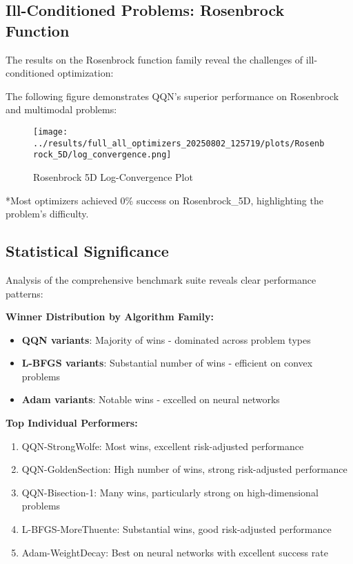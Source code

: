 \hypertarget{ill-conditioned-problems-rosenbrock-function}{%
\subsection{Ill-Conditioned Problems: Rosenbrock Function}\label{ill-conditioned-problems-rosenbrock-function}}

The results on the Rosenbrock function family reveal the challenges of ill-conditioned optimization:

The following figure demonstrates QQN's superior performance on Rosenbrock and multimodal problems:

\begin{figure}
\centering
\texttt{[image: ../results/full\_all\_optimizers\_20250802\_125719/plots/Rosenbrock\_5D/log\_convergence.png]}
\caption{Rosenbrock 5D Log-Convergence Plot}
\end{figure}

{}

*Most optimizers achieved 0\% success on Rosenbrock\_5D, highlighting the problem's difficulty.

\hypertarget{statistical-significance}{%
\subsection{Statistical Significance}\label{statistical-significance}}

Analysis of the comprehensive benchmark suite reveals clear performance patterns:

\textbf{Winner Distribution by Algorithm Family:}

\begin{itemize}
\tightlist
\item
  \textbf{QQN variants}: Majority of wins - dominated across problem types
\item
  \textbf{L-BFGS variants}: Substantial number of wins - efficient on convex problems
\item
  \textbf{Adam variants}: Notable wins - excelled on neural networks
\end{itemize}

\textbf{Top Individual Performers:}

\begin{enumerate}
\def\labelenumi{\arabic{enumi}.}
\tightlist
\item
  QQN-StrongWolfe: Most wins, excellent risk-adjusted performance
\item
  QQN-GoldenSection: High number of wins, strong risk-adjusted performance
\item
  QQN-Bisection-1: Many wins, particularly strong on high-dimensional problems
\item
  L-BFGS-MoreThuente: Substantial wins, good risk-adjusted performance
\item
  Adam-WeightDecay: Best on neural networks with excellent success rate
\end{enumerate}

